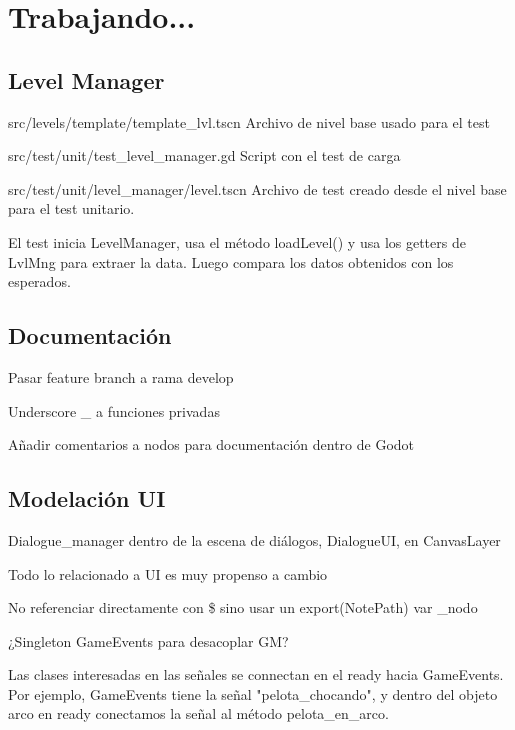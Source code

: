 
\section{Trabajando...}\label{Trabajando}

\subsection{Level Manager}

src/levels/template/template\_lvl.tscn Archivo de nivel base usado para el test

src/test/unit/test\_level\_manager.gd Script con el test de carga

src/test/unit/level\_manager/level.tscn Archivo de test creado desde el nivel base para el test unitario.

El test inicia LevelManager, usa el método loadLevel() y usa los getters de LvlMng para extraer la data. Luego compara los datos obtenidos con los esperados.


\subsection{Documentación}

Pasar feature branch a rama develop

Underscore \_ a funciones privadas

Añadir comentarios a nodos para documentación dentro de Godot

\subsection{Modelación UI}

Dialogue\_manager dentro de la escena de diálogos, DialogueUI, en CanvasLayer

Todo lo relacionado a UI es muy propenso a cambio

No referenciar directamente con \$ sino usar un export(NotePath) var \_nodo

¿Singleton GameEvents para desacoplar GM?

Las clases interesadas en las señales se connectan en el ready hacia GameEvents. Por ejemplo, GameEvents tiene la señal "pelota\_chocando", y dentro del objeto arco en ready conectamos la señal al método pelota\_en\_arco. 

